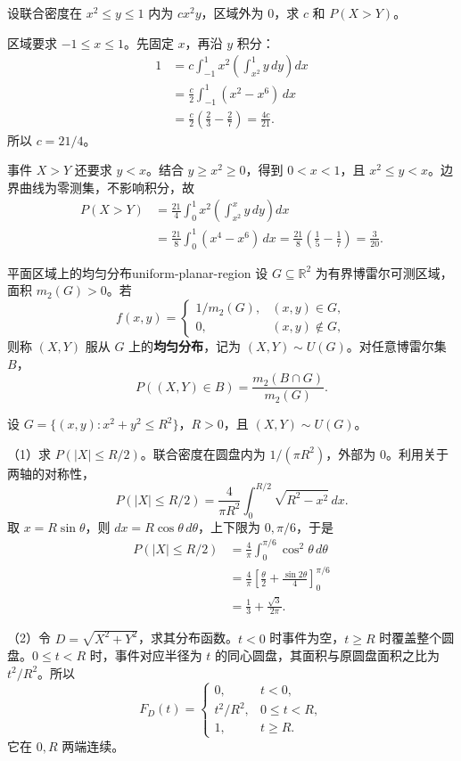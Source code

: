 \begin{example}[在抛物线围成的区域上归一化并计算概率]
设联合密度在 $x^2\leq y\leq1$ 内为 $cx^2y$，区域外为 $0$，求 $c$ 和 $P(X>Y)$。

区域要求 $-1\leq x\leq1$。先固定 $x$，再沿 $y$ 积分：
\begin{align*}
1&=c\int_{-1}^1x^2\left(\int_{x^2}^1y\,dy\right)dx\\
&=\frac c2\int_{-1}^1(x^2-x^6)\,dx\\
&=\frac c2\left(\frac23-\frac27\right)=\frac{4c}{21}.
\end{align*}
所以 $c=21/4$。

事件 $X>Y$ 还要求 $y<x$。结合 $y\geq x^2\geq0$，得到 $0<x<1$，且 $x^2\leq y<x$。边界曲线为零测集，不影响积分，故
\begin{align*}
P(X>Y)
&=\frac{21}4\int_0^1x^2\left(\int_{x^2}^{x}y\,dy\right)dx\\
&=\frac{21}8\int_0^1(x^4-x^6)\,dx
=\frac{21}8\left(\frac15-\frac17\right)=\frac3{20}.
\end{align*}
\end{example}

\begin{mydefinition}{平面区域上的均匀分布}{uniform-planar-region}
设 $G\subseteq\mathbb R^2$ 为有界博雷尔可测区域，面积 $m_2(G)>0$。若
\[
f(x,y)=
\begin{cases}
1/m_2(G),&(x,y)\in G,\\
0,&(x,y)\notin G,
\end{cases}
\]
则称 $(X,Y)$ 服从 $G$ 上的\textbf{均匀分布}，记为 $(X,Y)\sim U(G)$。对任意博雷尔集 $B$，
\[
P((X,Y)\in B)=\frac{m_2(B\cap G)}{m_2(G)}.
\]
\end{mydefinition}

\begin{example}[圆盘上的均匀分布]
设 $G=\{(x,y):x^2+y^2\leq R^2\}$，$R>0$，且 $(X,Y)\sim U(G)$。

（1）求 $P(|X|\leq R/2)$。联合密度在圆盘内为 $1/(\pi R^2)$，外部为 $0$。利用关于两轴的对称性，
\[
P(|X|\leq R/2)=\frac4{\pi R^2}\int_0^{R/2}\sqrt{R^2-x^2}\,dx.
\]
取 $x=R\sin\theta$，则 $dx=R\cos\theta\,d\theta$，上下限为 $0,\pi/6$，于是
\begin{align*}
P(|X|\leq R/2)
&=\frac4\pi\int_0^{\pi/6}\cos^2\theta\,d\theta\\
&=\frac4\pi\left[\frac\theta2+\frac{\sin2\theta}4\right]_0^{\pi/6}\\
&=\frac13+\frac{\sqrt3}{2\pi}.
\end{align*}

（2）令 $D=\sqrt{X^2+Y^2}$，求其分布函数。$t<0$ 时事件为空，$t\geq R$ 时覆盖整个圆盘。$0\leq t<R$ 时，事件对应半径为 $t$ 的同心圆盘，其面积与原圆盘面积之比为 $t^2/R^2$。所以
\[
F_D(t)=
\begin{cases}
0,&t<0,\\
t^2/R^2,&0\leq t<R,\\
1,&t\geq R.
\end{cases}
\]
它在 $0,R$ 两端连续。
\end{example}

